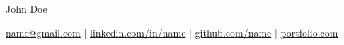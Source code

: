 \documentclass[11pt]{article}
\begin{document}
\centerline{\Huge John Doe}

\vspace{5pt}

%
%
\centerline{
  \href{mailto:name@gmail.com}{name@gmail.com}
  \;|\;
  \href{https://linkedin.com/in/name}{linkedin.com/in/name}
  \;|\;
  \href{https://github.com/name}{github.com/name}
  \;|\;
  \href{https://portfolio.com}{portfolio.com}
}

\vspace{-10pt}

%
%
%
%
%

%
%
\end{document}
